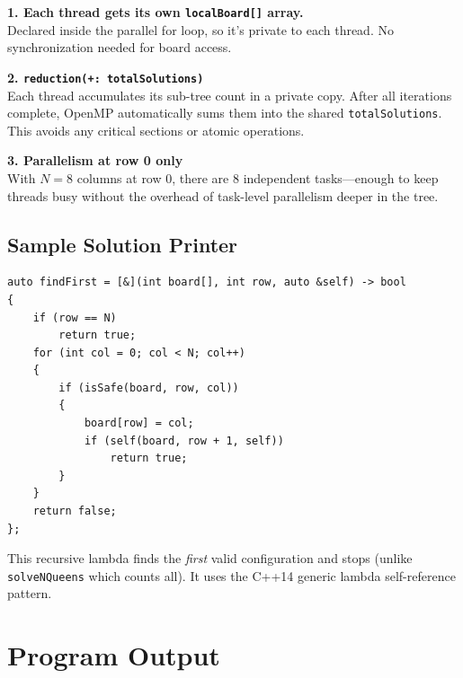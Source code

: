 \documentclass[11pt]{article}
\begin{document}
\begin{shadedbox}
\textbf{1. Each thread gets its own \texttt{localBoard[]} array.} \\
Declared inside the parallel for loop, so it's private to each thread. No synchronization needed for board access.

\vspace{6pt}
\textbf{2. \texttt{reduction(+: totalSolutions)}} \\
Each thread accumulates its sub-tree count in a private copy. After all iterations complete, OpenMP automatically sums them into the shared \texttt{totalSolutions}. This avoids any critical sections or atomic operations.

\vspace{6pt}
\textbf{3. Parallelism at row 0 only} \\
With $N = 8$ columns at row 0, there are 8 independent tasks---enough to keep threads busy without the overhead of task-level parallelism deeper in the tree.
\end{shadedbox}

\subsection{Sample Solution Printer}

\begin{codebox}
\begin{lstlisting}
auto findFirst = [&](int board[], int row, auto &self) -> bool
{
    if (row == N)
        return true;
    for (int col = 0; col < N; col++)
    {
        if (isSafe(board, row, col))
        {
            board[row] = col;
            if (self(board, row + 1, self))
                return true;
        }
    }
    return false;
};
\end{lstlisting}
\end{codebox}

This recursive lambda finds the \textit{first} valid configuration and stops (unlike \texttt{solveNQueens} which counts all). It uses the C++14 generic lambda self-reference pattern.

\newpage

\section{Program Output}
\end{document}
